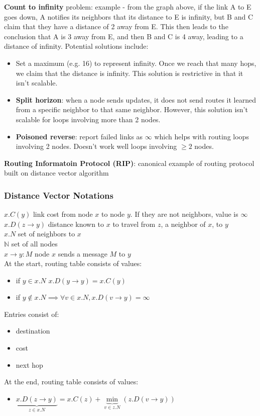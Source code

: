 \documentclass{article}
\begin{document}
  \textbf{Count to infinity} problem: example - from the graph above, if the link A to E goes down, A notifies its neighbors that its distance to E is infinity, but B and C claim that they have a distance of 2 away from E. This then leads to the conclusion that A is 3 away from E, and then B and C is 4 away, leading to a distance of infinity. Potential solutions include:
  \begin{itemize}
    \item Set a maximum (e.g. 16) to represent infinity. Once we reach that many hops, we claim that the distance is infinity. This solution is restrictive in that it isn't scalable.
    \item \textbf{Split horizon}: when a node sends updates, it does not send routes it learned from a specific neighbor to that same neighbor. However, this solution isn't scalable for loops involving more than 2 nodes.
    \item \textbf{Poisoned reverse}: report failed links as $\infty$ which helps with routing loops involving 2 nodes. Doesn't work well loops involving $\geq 2$ nodes.
  \end{itemize}
  \textbf{Routing Informatoin Protocol (RIP)}: canonical example of routing protocol built on distance vector algorithm
  \subsubsection{Distance Vector Notations}
  $x.C(y)$ link cost from node $x$ to node $y$. If they are not neighbors, value is $\infty$ \\
  $x.D(z \rightarrow y)$ distance known to $x$ to travel from $z$, a neighbor of $x$, to $y$ \\
  $x.N$ set of neighbors to $x$ \\
  $\mathbb{N}$ set of all nodes \\
  $x \rightarrow y : M$ node $x$ sends a message $M$ to $y$ \\
  At the start, routing table consists of values:
  \begin{itemize}
    \item if $y \in x.N$ \implies $x.D(y \rightarrow y) = x.C(y)$
    \item if $y \notin x.N \implies \forall v \in x.N, x.D(v \rightarrow y) = \infty$
  \end{itemize}
  Entries consist of:
  \begin{itemize}
    \item destination
    \item cost
    \item next hop
  \end{itemize}
  At the end, routing table consists of values:
  \begin{itemize}
  \item $\underbrace{x.D(z \rightarrow y)}_{z \in x.N} = x.C(z) + \underbrace{\min}_{v \in z.N}(z.D(v \rightarrow y))$
  \end{itemize}
\end{document}
